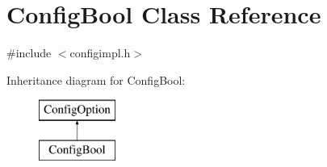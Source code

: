 \hypertarget{class_config_bool}{}\section{Config\+Bool Class Reference}
\label{class_config_bool}


{\ttfamily \#include $<$configimpl.\+h$>$}

Inheritance diagram for Config\+Bool\+:\begin{figure}[H]
\begin{center}
\leavevmode
\includegraphics[height=2.000000cm]{class_config_bool}
\end{center}
\end{figure}
